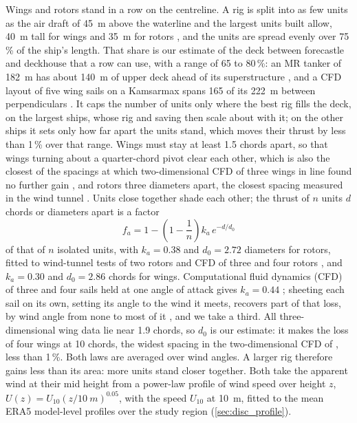 Wings and rotors stand in a row on the centreline. A rig is split into as few units as the air draft of \SI{45}{m} above the waterline and the largest units built allow, \SI{40}{m} tall for wings \citep{alfalaval2026oceanbird} and \SI{35}{m} for rotors \citep{maritimeexecutive2024sohar}, and the units are spread evenly over 75\,\% of the ship's length. That share is our estimate of the deck between forecastle and deckhouse that a row can use, with a range of 65 to 80\,\%: an MR tanker of \SI{182}{m} has about \SI{140}{m} of upper deck ahead of its superstructure \citep{han2025}, and a CFD layout of five wing sails on a Kamsarmax spans 165 of its \SI{222}{m} between perpendiculars \citep{mboumba2022}. It caps the number of units only where the best rig fills the deck, on the largest ships, whose rig and saving then scale about with it; on the other ships it sets only how far apart the units stand, which moves their thrust by less than 1\,\% over that range. Wings must stay at least 1.5 chords apart, so that wings turning about a quarter-chord pivot clear each other, which is also the closest of the spacings at which two-dimensional CFD of three wings in line found no further gain \citep{wang2024}, and rotors three diameters apart, the closest spacing measured in the wind tunnel \citep{bordogna2020}. Units close together shade each other; the thrust of $n$ units $d$ chords or diameters apart is a factor
\begin{equation}
f_a = 1 - \left(1 - \frac{1}{n}\right) k_a\, e^{-d/d_0}
\end{equation}
of that of $n$ isolated units, with $k_a=0.38$ and $d_0=2.72$ diameters for rotors, fitted to wind-tunnel tests of two rotors \citep{bordogna2020} and CFD of three and four rotors \citep{han2025}, and $k_a=0.30$ and $d_0=2.86$ chords for wings. Computational fluid dynamics (CFD) of three and four sails held at one angle of attack gives $k_a=0.44$ \citep{malmek2024,xu2025}; sheeting each sail on its own, setting its angle to the wind it meets, recovers part of that loss, by wind angle from none to most of it \citep{vanreen2026}, and we take a third. All three-dimensional wing data lie near 1.9 chords, so $d_0$ is our estimate: it makes the loss of four wings at 10 chords, the widest spacing in the two-dimensional CFD of \citet{wang2024}, less than 1\,\%. Both laws are averaged over wind angles. A larger rig therefore gains less than its area: more units stand closer together. Both take the apparent wind at their mid height from a power-law profile of wind speed over height $z$, $U(z)=U_{10}(z/\SI{10}{m})^{0.05}$, with the speed $U_{10}$ at \SI{10}{m}, fitted to the mean ERA5 model-level profiles over the study region (\cref{sec:disc_profile}).

